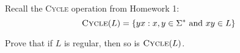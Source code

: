\begin{problem}
  Recall the \textsc{Cycle} operation from Homework 1:
  \[ \textsc{Cycle}(L) = \left\{yx : x, y \in \Sigma^* \text{ and } xy \in L\right\} \]
  
  \step
  Prove that if $L$ is regular, then so is $\textsc{Cycle}(L)$.
\end{problem}
\begin{Answer}
  
\end{Answer}
